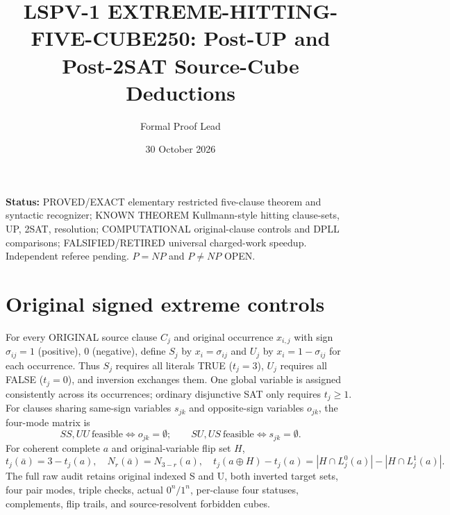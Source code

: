 \documentclass{article}
\title{LSPV-1 EXTREME-HITTING-FIVE-CUBE250: Post-UP and Post-2SAT Source-Cube Deductions}
\author{Formal Proof Lead}\date{30 October 2026}
\begin{document}
\maketitle
\noindent\textbf{Status:} PROVED/EXACT elementary restricted five-clause theorem and syntactic recognizer; KNOWN THEOREM Kullmann-style hitting clause-sets, UP, 2SAT, resolution; COMPUTATIONAL original-clause controls and DPLL comparisons; FALSIFIED/RETIRED universal charged-work speedup. Independent referee pending. $P=NP$ and $P\ne NP$ OPEN.
\section{Original signed extreme controls}
For every ORIGINAL source clause $C_j$ and original occurrence $x_{i,j}$ with sign $\sigma_{ij}=1$ (positive), $0$ (negative), define $S_j$ by $x_i=\sigma_{ij}$ and $U_j$ by $x_i=1-\sigma_{ij}$ for each occurrence. Thus $S_j$ requires all literals TRUE ($t_j=3$), $U_j$ requires all FALSE ($t_j=0$), and inversion exchanges them. One global variable is assigned consistently across its occurrences; ordinary disjunctive SAT only requires $t_j\ge1$. For clauses sharing same-sign variables $s_{jk}$ and opposite-sign variables $o_{jk}$, the four-mode matrix is
\[
SS,UU\ \mathrm{feasible}\Longleftrightarrow o_{jk}=\emptyset;\qquad
SU,US\ \mathrm{feasible}\Longleftrightarrow s_{jk}=\emptyset.
\]
For coherent complete $a$ and original-variable flip set $H$,
\[
t_j(\bar a)=3-t_j(a),\quad N_r(\bar a)=N_{3-r}(a),\quad
t_j(a\oplus H)-t_j(a)=|H\cap L_j^0(a)|-|H\cap L_j^1(a)|.
\]
The full raw audit retains original indexed S and U, both inverted target sets, four pair modes, triple checks, actual $0^n/1^n$, per-clause four statuses, complements, flip trails, and source-resolvent forbidden cubes.
\end{document}
